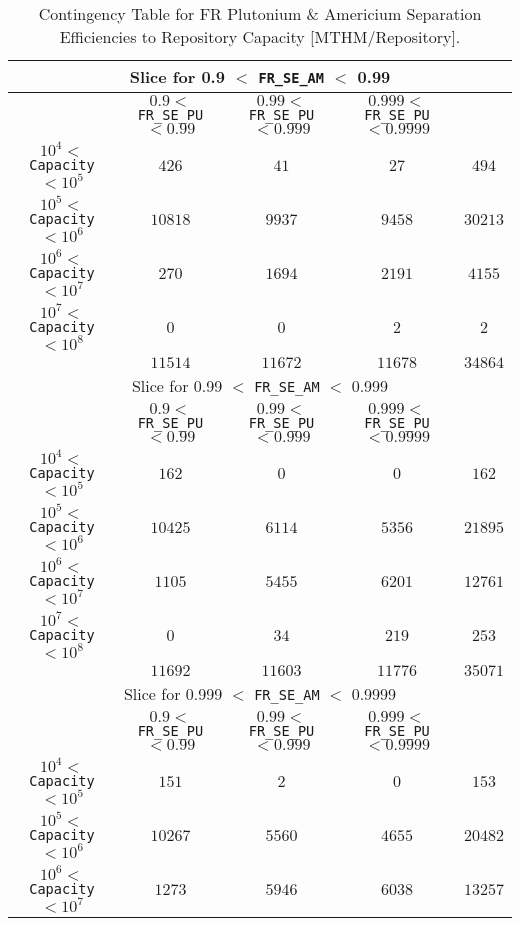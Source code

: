 \begin{center}
\begin{table}[htbp]
\caption{Contingency Table for FR Plutonium \& Americium Separation Efficiencies to Repository Capacity [MTHM/Repository].}
\label{FR_SE_PU_and_FR_SE_AM_to_Capacity_with_IJK433}
\footnotesize
\begin{center}
\begin{tabular}{|c||c|c|c||c|}
\hline
\multicolumn{5}{|c|}{Slice for 0.9 $<$ \texttt{FR\_SE\_AM} $<$ 0.99}\\
\hline
&$0.9 <$ \texttt{FR\_SE\_PU} $< 0.99$&$0.99 <$ \texttt{FR\_SE\_PU} $< 0.999$&$0.999 <$ \texttt{FR\_SE\_PU} $< 0.9999$&\\
\hline
$10^4 <$ \texttt{Capacity} $< 10^5$&$426$&$41$&$27$&$494$\\
\hline
$10^5 <$ \texttt{Capacity} $< 10^6$&$10818$&$9937$&$9458$&$30213$\\
\hline
$10^6 <$ \texttt{Capacity} $< 10^7$&$270$&$1694$&$2191$&$4155$\\
\hline
$10^7 <$ \texttt{Capacity} $< 10^8$&$0$&$0$&$2$&$2$\\
\hline
&$11514$&$11672$&$11678$&$34864$\\
\hline
\hline
\multicolumn{5}{|c|}{Slice for 0.99 $<$ \texttt{FR\_SE\_AM} $<$ 0.999}\\
\hline
&$0.9 <$ \texttt{FR\_SE\_PU} $< 0.99$&$0.99 <$ \texttt{FR\_SE\_PU} $< 0.999$&$0.999 <$ \texttt{FR\_SE\_PU} $< 0.9999$&\\
\hline
$10^4 <$ \texttt{Capacity} $< 10^5$&$162$&$0$&$0$&$162$\\
\hline
$10^5 <$ \texttt{Capacity} $< 10^6$&$10425$&$6114$&$5356$&$21895$\\
\hline
$10^6 <$ \texttt{Capacity} $< 10^7$&$1105$&$5455$&$6201$&$12761$\\
\hline
$10^7 <$ \texttt{Capacity} $< 10^8$&$0$&$34$&$219$&$253$\\
\hline
&$11692$&$11603$&$11776$&$35071$\\
\hline
\hline
\multicolumn{5}{|c|}{Slice for 0.999 $<$ \texttt{FR\_SE\_AM} $<$ 0.9999}\\
\hline
&$0.9 <$ \texttt{FR\_SE\_PU} $< 0.99$&$0.99 <$ \texttt{FR\_SE\_PU} $< 0.999$&$0.999 <$ \texttt{FR\_SE\_PU} $< 0.9999$&\\
\hline
$10^4 <$ \texttt{Capacity} $< 10^5$&$151$&$2$&$0$&$153$\\
\hline
$10^5 <$ \texttt{Capacity} $< 10^6$&$10267$&$5560$&$4655$&$20482$\\
\hline
$10^6 <$ \texttt{Capacity} $< 10^7$&$1273$&$5946$&$6038$&$13257$\\

\end{tabular}
\end{center}
\end{table}
\end{center}
